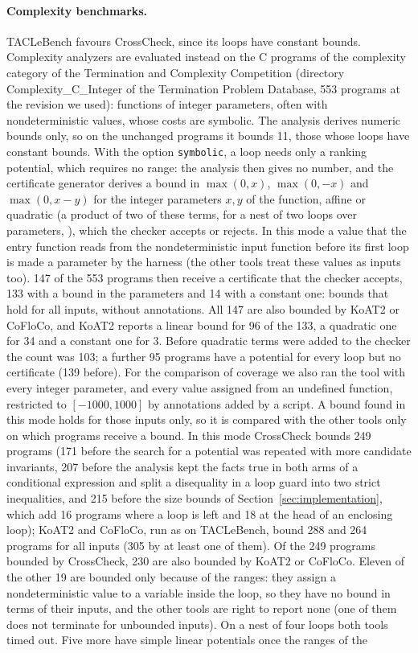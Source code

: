 \documentclass[oneside,english]{amsart}
\numberwithin{equation}{section}
\numberwithin{figure}{section}
\theoremstyle{plain}
\theoremstyle{definition}
\theoremstyle{plain}
\theoremstyle{remark}
\theoremstyle{plain}
\theoremstyle{definition}
\theoremstyle{plain}
\theoremstyle{remark}
\newcommand{\lean}[1]{{\ttfamily\small #1}}
\begin{document}
\paragraph{Complexity benchmarks.}
TACLeBench favours CrossCheck, since its loops have constant bounds. Complexity analyzers are evaluated instead on the C programs of the complexity category of the Termination and Complexity Competition \cite{giesl2019termcomp} (directory \lean{Complexity\_C\_Integer} of the Termination Problem Database, 553 programs at the revision we used): functions of integer parameters, often with nondeterministic values, whose costs are symbolic. The analysis derives numeric bounds only, so on the unchanged programs it bounds 11, those whose loops have constant bounds. With the option \texttt{symbolic}, a loop needs only a ranking potential, which requires no range: the analysis then gives no number, and the certificate generator derives a bound in $\max(0, x)$, $\max(0, -x)$ and $\max(0, x - y)$ for the integer parameters $x, y$ of the function, affine or quadratic (a product of two of these terms, for a nest of two loops over parameters, \cite[Section~\ref{I-subsec:checker}]{crosscheckTheory}), which the checker accepts or rejects. In this mode a value that the entry function reads from the nondeterministic input function before its first loop is made a parameter by the harness (the other tools treat these values as inputs too). 147 of the 553 programs then receive a certificate that the checker accepts, 133 with a bound in the parameters and 14 with a constant one: bounds that hold for all inputs, without annotations. All 147 are also bounded by KoAT2 or CoFloCo, and KoAT2 reports a linear bound for 96 of the 133, a quadratic one for 34 and a constant one for 3. Before quadratic terms were added to the checker the count was 103; a further 95 programs have a potential for every loop but no certificate (139 before). For the comparison of coverage we also ran the tool with every integer parameter, and every value assigned from an undefined function, restricted to $[-1000, 1000]$ by annotations added by a script. A bound found in this mode holds for those inputs only, so it is compared with the other tools only on which programs receive a bound. In this mode CrossCheck bounds 249 programs (171 before the search for a potential was repeated with more candidate invariants, 207 before the analysis kept the facts true in both arms of a conditional expression and split a disequality in a loop guard into two strict inequalities, and 215 before the size bounds of Section~\ref{sec:implementation}, which add 16 programs where a loop is left and 18 at the head of an enclosing loop); KoAT2 and CoFloCo, run as on TACLeBench, bound 288 and 264 programs for all inputs (305 by at least one of them). Of the 249 programs bounded by CrossCheck, 230 are also bounded by KoAT2 or CoFloCo. Eleven of the other 19 are bounded only because of the ranges: they assign a nondeterministic value to a variable inside the loop, so they have no bound in terms of their inputs, and the other tools are right to report none (one of them does not terminate for unbounded inputs). On a nest of four loops both tools timed out. Five more have simple linear potentials once the ranges of the 
\end{document}
